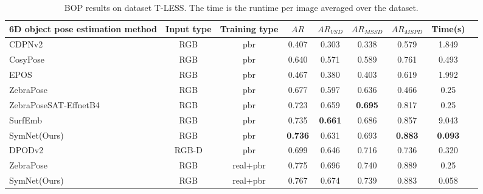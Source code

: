 \begin{sidewaystable}[t]
        \centering
        \caption{
                BOP results on dataset T-LESS. The time is the runtime per image averaged over the dataset.
        }
        \begin{tabular}{l c c c c c c c c}
        \toprule
        6D object pose estimation method &Input type&Training type&$AR$&$AR_{VSD}$&$AR_{MSSD}$&$AR_{MSPD}$&Time(s)\\       %
        \midrule
        CDPNv2~\cite{li2019cdpn}&RGB&pbr&0.407&0.303&0.338&0.579&1.849 \\
        CosyPose~\cite{labbe2020cosypose}&RGB&pbr&0.640&0.571&0.589&0.761&0.493\\
        EPOS~\cite{hodan2020epos}&RGB&pbr&0.467&0.380&0.403&0.619&1.992 \\
        ZebraPose~\cite{su2022zebrapose}&RGB&pbr&0.677&0.597&0.636&0.466&0.25 \\
        ZebraPoseSAT-EffnetB4~\cite{su2022zebrapose}&RGB&pbr&0.723&0.659&\textbf{0.695}&0.817&0.25 \\
        SurfEmb~\cite{haugaard2022surfemb}&RGB&pbr&0.735&\textbf{0.661}&0.686&0.857&9.043 \\
        SymNet(Ours)&RGB&pbr&\textbf{0.736}&0.631&0.693&\textbf{0.883}&\textbf{0.093} \\
        \midrule
        DPODv2~\cite{shugurov2021dpodv2}&RGB-D&pbr&0.699&0.646&0.716&0.736&0.320 \\
        \midrule
        ZebraPose~\cite{su2022zebrapose}&RGB&real+pbr&0.775&0.696&0.740&0.889&0.25 \\
        SymNet(Ours)&RGB&real+pbr&0.767&0.674&0.739&0.883&0.058\\
        \bottomrule
        \end{tabular}
\label{tab:tless_bop}
\end{sidewaystable}

